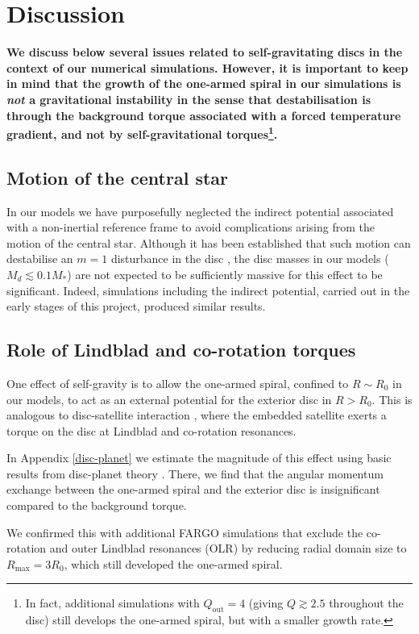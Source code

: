 \section{Discussion}\label{discussions} 
{\bf
  We discuss below several issues related to self-gravitating
  discs in the context of our numerical simulations. However, it is
  important to keep in mind that 
  the growth of the one-armed spiral in our simulations is
  \emph{not} a gravitational instability in the sense that
  destabilisation is through the background torque associated with a
  forced temperature gradient, and not by self-gravitational torques\footnote{In fact, additional simulations with $Q_\mathrm{out}=4$ (giving $Q\gtrsim2.5$ throughout the disc) still 
  develops the one-armed spiral, but with a smaller growth rate.}. 
}

{\bf
  \subsection{Motion of the central star} 
  In our models we have purposefully neglected the indirect potential
  associated with a non-inertial reference frame to avoid
  complications arising from the motion of the central star.  
  Although it has been established that such motion can destabilise an
  $m=1$ disturbance in the disc \citep{adams89,shu90,michael10}, 
  the disc masses in our models ($M_d\lesssim 
  0.1 M_*$) are not expected to be sufficiently massive for this effect to be
  significant. Indeed, simulations including the
  indirect potential, carried out in the early stages of this project,
  produced similar results.    
  
  \subsection{Role of Lindblad and co-rotation torques}
  One effect of self-gravity is to allow the one-armed spiral,
  confined to $R\sim R_0$ in our models, to act as an external potential for the
  exterior disc in $R>R_0$. This is 
  analogous to disc-satellite interaction 
  \citep{goldreich79}, where the embedded satellite exerts a torque on
  the disc at Lindblad and co-rotation resonances. 

  In Appendix \ref{disc-planet} we estimate the magnitude of this effect
  using basic results from disc-planet theory \citep[see, e.g.][and
  references therein]{papaloizou07}. There, we find that the angular
  momentum exchange between the one-armed spiral and the exterior disc
  is insignificant compared to the background torque.  
  
  We confirmed this with additional FARGO simulations that exclude the
  co-rotation and outer Lindblad resonances (OLR) by reducing radial domain
  size to $R_\mathrm{max} = 3 R_0$, which still developed 
  the one-armed spiral. 
}


